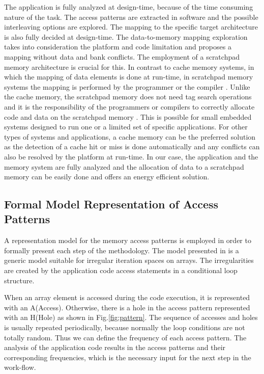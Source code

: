\documentclass[prodmode,acmtecs]{acmsmall}
\begin{document}
The application is fully analyzed at design-time, because of the time consuming nature of the task. 
The access patterns are extracted in software and the possible interleaving options are explored. 
The mapping to the specific target architecture is also fully decided at design-time.
The data-to-memory mapping exploration takes into consideration the platform and code limitation and proposes a mapping without data and bank conflicts.
The employment of a scratchpad memory architecture is crucial for this.
In contrast to cache memory systems, in which the mapping of data elements is done at run-time, in scratchpad memory systems the mapping is performed by the programmer or the compiler \cite{ishitobi2007code}. 
Unlike the cache memory, the scratchpad memory does not need tag search operations and it is the responsibility of the programmers or compilers to correctly allocate code and data on the scratchpad memory \cite{steinke2002assigning}.
This is possible for small embedded systems designed to run one or a limited set of specific applications. 
For other types of systems and applications, a cache memory can be the preferred solution as the detection of a cache hit or miss is done automatically and any conflicts can also be resolved by the platform at run-time.
In our case, the application and the memory system are fully analyzed and the allocation of data to a scratchpad memory can be easily done and offers an energy efficient solution.

\subsection{Formal Model Representation of Access Patterns }

A representation model for the memory access patterns is employed in order to formally present each step of the methodology.
The model presented in \cite{Ang13} is a generic model suitable for irregular iteration spaces on arrays.
The irregularities are created by the application code access statements in a conditional loop structure.

When an array element is accessed during the code execution, it is represented with an A(Access).
Otherwise, there is a hole in the access pattern represented with an H(Hole) as shown in Fig.\ref{fig:pattern}.
The sequence of accesses and holes is usually repeated periodically, because normally the loop conditions are not totally random.
Thus we can define the frequency of each access pattern.
The analysis of the application code results in the access patterns and their corresponding frequencies, which is the necessary input for the next step in the work-flow.
\end{document}
